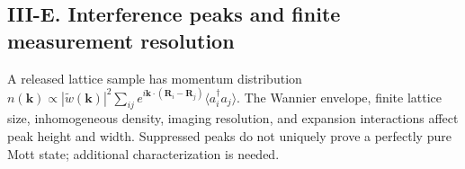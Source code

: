 \documentclass[11pt,a4paper]{article}
\begin{document}
\subsection*{III-E. Interference peaks and finite measurement resolution}
A released lattice sample has momentum distribution $n(\mathbf k)\propto|\widetilde w(\mathbf k)|^2\sum_{ij} e^{i\mathbf k\cdot(\mathbf R_i-\mathbf R_j)}\langle a_i^\dagger a_j\rangle$. The Wannier envelope, finite lattice size, inhomogeneous density, imaging resolution, and expansion interactions affect peak height and width. Suppressed peaks do not uniquely prove a perfectly pure Mott state; additional characterization is needed.
\end{document}

